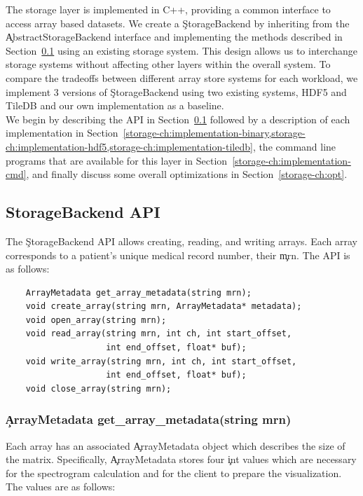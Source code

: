 The storage layer is implemented in C++, providing a common interface to access
array based datasets. We create a \c{StorageBackend} by inheriting from the
\c{AbstractStorageBackend} interface and implementing the methods described in
Section~\ref{storage-ch:api} using an existing storage system. This design
allows us to interchange storage systems without affecting other layers within
the overall system. To compare the tradeoffs between different array store
systems for each workload, we implement 3 versions of \c{StorageBackend} using
two existing systems, HDF5 \cite{hdf5} and TileDB \cite{tiledb} and our own
implementation as a baseline. \\

We begin by describing the API in Section~\ref{storage-ch:api} followed by a
description of each implementation in
Section~\cref{storage-ch:implementation-binary,storage-ch:implementation-hdf5,storage-ch:implementation-tiledb},
the command line programs that are available for this layer in
Section~\ref{storage-ch:implementation-cmd}, and finally discuss some overall
optimizations in Section~\ref{storage-ch:opt}.

\subsection{StorageBackend API}\label{storage-ch:api}

The \c{StorageBackend} API allows creating, reading, and writing arrays. Each
array corresponds to a patient's unique medical record number, their \c{mrn}.
The API is as follows:

\begin{lstlisting}
    ArrayMetadata get_array_metadata(string mrn);
    void create_array(string mrn, ArrayMetadata* metadata);
    void open_array(string mrn);
    void read_array(string mrn, int ch, int start_offset,
                    int end_offset, float* buf);
    void write_array(string mrn, int ch, int start_offset,
                    int end_offset, float* buf);
    void close_array(string mrn);
\end{lstlisting}

\subsubsection{\c{ArrayMetadata get\_array\_metadata(string mrn)}}

Each array has an associated \c{ArrayMetadata} object which describes the size
of the matrix. Specifically, \c{ArrayMetadata} stores four \c{int} values which
are necessary for the spectrogram calculation and for the client to prepare the
visualization. The values are as follows:


